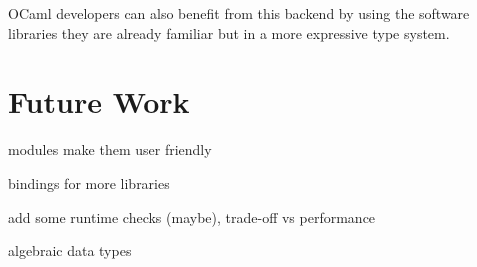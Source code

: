 OCaml developers can also benefit from this backend by using the 
software libraries they are already familiar but in a more expressive 
type system.

\section{Future Work}

modules make them user friendly


bindings for more libraries

add some runtime checks (maybe), trade-off vs performance

algebraic data types



